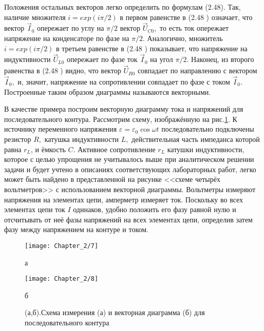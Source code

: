 {Положения остальных векторов легко определить по формулам (2.48). Так, наличие множи\-теля $i=exp(i\pi/2)$ в первом равенстве в (2.48 ) означает, что вектор $\vec I_0$ опережает по углу на $\pi/2$ вектор $\vec U_{C0},$ то есть ток опережает напряжение на конденсаторе по фазе на $\pi/2.$ Анало\-гично, множитель $i=exp(i\pi/2)$ в третьем равенстве в (2.48 ) показывает, что напряжение на индуктивности $\vec U_{L0}$ опережает по фазе ток $\vec I_0$ на угол $\pi/2.$ Наконец, из второго равенства в (2.48 ) видно, что вектор $\vec U_{R0}$ совпадает по направлению с вектором $\vec I_0,$ и, значит, напряжение на сопротивлении совпадает по фазе с током $\vec I_0$. Построенные таким образом диаграммы назы\-ваются \textsf{векторными.}

В качестве примера построим векторную диаграмму тока и напряжений для последователь\-ного контура. Рассмотрим схему, изображённую на рис.\ref{fig5}. К источнику переменного напряжения $\varepsilon=\varepsilon_0\cos\omega t$ последовательно подключены резистор $R,$ катушка индуктивности $L,$ действительная часть импеданса которой равна $r_L$, и ёмкость $C.$ Активное сопротивление $r_L$ катушки индуктивности, которое с целью упрощения не учитывалось выше при аналитическом решении задачи и будет учтено в описаниях соответствующих лабораторных работ, легко может быть найдено в представленной на рисунке <<схеме четырёх вольтметров>> с использованием векторной диаграммы. Вольтметры измеряют напряжения на элементах цепи, амперметр измеряет ток. Поскольку во всех элементах цепи ток $I$ одинаков, удобно положить его фазу равной нулю и отсчитывать от неё фазы напряжений на всех элементах цепи, определив затем фазу   между напряжением на контуре и током.

\begin{figure}[h]
	\begin{minipage}[h]{0.37\linewidth}
		\centering
		\texttt{[image: Chapter\_2/7]}
		\caption{а}
	\end{minipage}
	\hfill
	\begin{minipage}[h]{0.49\linewidth}
		\centering
		\texttt{[image: Chapter\_2/8]}
		\caption{б}
	\end{minipage}
	\caption{(а,б).Схема измерения (а) и векторная  диаграмма (б) для последовательного контура}
	\label{fig5}
\end{figure}

}
